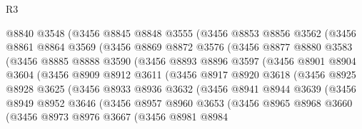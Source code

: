 \begin{lexlean}{R3}
\begin{coremodule}
            @8840
            @3548
            (@3456
              @8845
              @8848
              @3555
              (@3456
                @8853
                @8856
                @3562
                (@3456
                  @8861
                  @8864
                  @3569
                  (@3456
                    @8869
                    @8872
                    @3576
                    (@3456
                      @8877
                      @8880
                      @3583
                      (@3456
                        @8885
                        @8888
                        @3590
                        (@3456
                          @8893
                          @8896
                          @3597
                          (@3456
                            @8901
                            @8904
                            @3604
                            (@3456
                              @8909
                              @8912
                              @3611
                              (@3456
                                @8917
                                @8920
                                @3618
                                (@3456
                                  @8925
                                  @8928
                                  @3625
                                  (@3456
                                    @8933
                                    @8936
                                    @3632
                                    (@3456
                                      @8941
                                      @8944
                                      @3639
                                      (@3456
                                        @8949
                                        @8952
                                        @3646
                                        (@3456
                                          @8957
                                          @8960
                                          @3653
                                          (@3456
                                            @8965
                                            @8968
                                            @3660
                                            (@3456
                                              @8973
                                              @8976
                                              @3667
                                              (@3456
                                                @8981
                                                @8984

\end{coremodule}
\end{lexlean}
